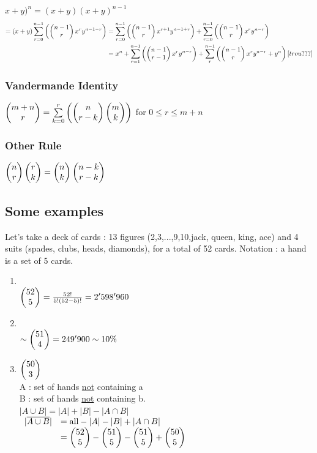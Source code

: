 \documentclass[12pt,a4paper]{article}
\begin{document}
$x+y)^n = (x+y)(x+y)^{n-1}$
\begin{align*}
 = (x+y)\somme{n-1}{r=0}{\combin{n-1}{r} x^ry^{n-1-r}} &= \somme{n-1}{r=0} {\combin{n-1}{r} x^{r+1}y^{n-1+r}} + \somme{n-1}{r=0} {\combin{n-1}{r} x^ry^{n-r}}\\
& =x^n+\somme{n-1}{r=1}{\combin{n-1}{r-1} x^ry^{n-r}} + \somme{n-1}{r}{\combin{n-1}{r}x^ry^{n-r}+y^n}
[trou???]
\end{align*}
\subsubsection{Vandermande Identity}
$\combin{m+n}{r} = \somme{r}{k=0}{\combin{n}{r-k}\combin{m}{k}}$ for $0 \leq r \leq m+n$

\subsubsection{Other Rule}
$\combin{n}{r}\combin{r}{k} = \combin{n}{k}\combin{n-k}{r-k}$

\subsection{Some examples}
Let's take a deck of cards : 13 figures (2,3,...,9,10,jack, queen, king, ace) and 4 suits (spades, clubs, heads, diamonds), for a total of 52 cards. Notation : a hand is a set of 5 cards.
\begin{enumerate}

	\item {}\\
			$\combi{52}{5} = \frac{52!}{5!(52-5)!} = 2'598'960$
	\item {}\\
		$\sim \combi{51}{4} = 249'900 \sim 10\%$
	\item $\combi{50}{3}$\\
	A : set of hands \underline{not} containing a\\
	B : set of hands \underline{not} containing b.\\
	$|A\cup B| = |A| + |B| - |A\cap B|$\\
	$\begin{array}{ll}
	|\overline{A\cup B}| & = \text{all}-|A|-|B|+|A\cap B|\\
	& =\combi{52}{5} - \combi{51}{5}-\combi{51}{5} + \combi{50}{5}
	\end{array}$
\end{enumerate}
\end{document}
